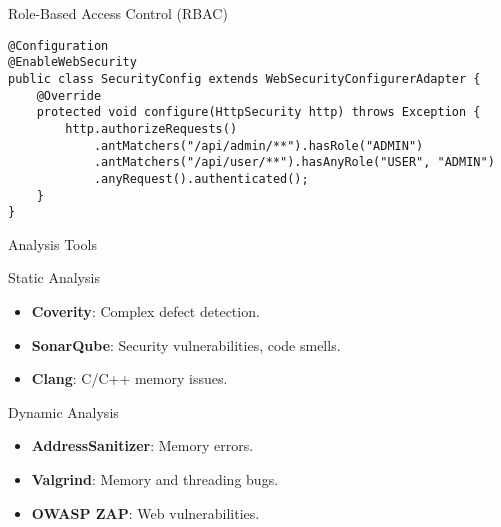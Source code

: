 \documentclass[12pt]{beamer}
\begin{document}
\begin{frame}[fragile]{Role-Based Access Control (RBAC)}
  \begin{lstlisting}[style=javastyle]
@Configuration
@EnableWebSecurity
public class SecurityConfig extends WebSecurityConfigurerAdapter {
    @Override
    protected void configure(HttpSecurity http) throws Exception {
        http.authorizeRequests()
            .antMatchers("/api/admin/**").hasRole("ADMIN")
            .antMatchers("/api/user/**").hasAnyRole("USER", "ADMIN")
            .anyRequest().authenticated();
    }
}
  \end{lstlisting}
\end{frame}

\begin{frame}{Analysis Tools}
  \begin{block}{Static Analysis}
    \begin{itemize}
      \item \textbf{Coverity}: Complex defect detection.
      \item \textbf{SonarQube}: Security vulnerabilities, code smells.
      \item \textbf{Clang}: C/C++ memory issues.
    \end{itemize}
  \end{block}
  \begin{block}{Dynamic Analysis}
    \begin{itemize}
      \item \textbf{AddressSanitizer}: Memory errors.
      \item \textbf{Valgrind}: Memory and threading bugs.
      \item \textbf{OWASP ZAP}: Web vulnerabilities.
    \end{itemize}
  \end{block}
\end{frame}
\end{document}
